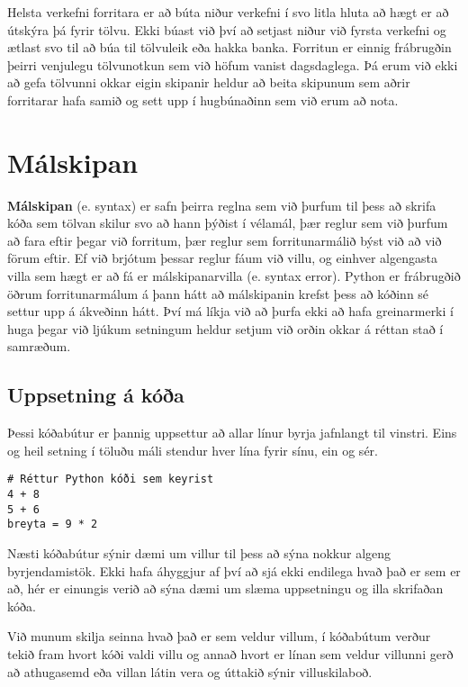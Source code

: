 Helsta verkefni forritara er að búta niður verkefni í svo litla hluta að hægt er að útskýra þá fyrir tölvu.
Ekki búast við því að setjast niður við fyrsta verkefni og ætlast svo til að búa til tölvuleik eða hakka banka.
Forritun er einnig frábrugðin þeirri venjulegu tölvunotkun sem við höfum vanist dagsdaglega.
Þá erum við ekki að gefa tölvunni okkar eigin skipanir heldur að beita skipunum sem aðrir forritarar hafa samið og sett upp í hugbúnaðinn sem við erum að nota.


\section{Málskipan}

\textbf{Málskipan} (e. syntax) er safn þeirra reglna sem við þurfum til þess að skrifa kóða sem tölvan skilur svo að hann þýðist í vélamál, þær reglur sem við þurfum að fara eftir þegar við forritum, þær reglur sem forritunarmálið býst við að við förum eftir. 
Ef við brjótum þessar reglur fáum við villu, og einhver algengasta villa sem hægt er að fá er málskipanarvilla (e. syntax error). 
Python er frábrugðið öðrum forritunarmálum á þann hátt að málskipanin krefst þess að kóðinn sé settur upp á ákveðinn hátt. 
Því má líkja við að þurfa ekki að hafa greinarmerki í huga þegar við ljúkum setningum heldur setjum við orðin okkar á réttan stað í samræðum.

\subsection{Uppsetning á kóða}
Þessi kóðabútur er þannig uppsettur að allar línur byrja jafnlangt til vinstri.
Eins og heil setning í töluðu máli stendur hver lína fyrir sínu, ein og sér.
\begin{lstlisting}[caption=Réttur Python kóði, label=lst:inng-kóðadæmi]
# Réttur Python kóði sem keyrist
4 + 8
5 + 6
breyta = 9 * 2
\end{lstlisting}

Næsti kóðabútur sýnir dæmi um villur til þess að sýna nokkur algeng byrjendamistök.
Ekki hafa áhyggjur af því að sjá ekki endilega hvað það er sem er að, hér er einungis verið að sýna dæmi um slæma uppsetningu og illa skrifaðan kóða.

Við munum skilja seinna hvað það er sem veldur villum, í kóðabútum verður tekið fram hvort kóði valdi villu og annað hvort er línan sem veldur villunni gerð að athugasemd eða villan látin vera og úttakið sýnir villuskilaboð.

